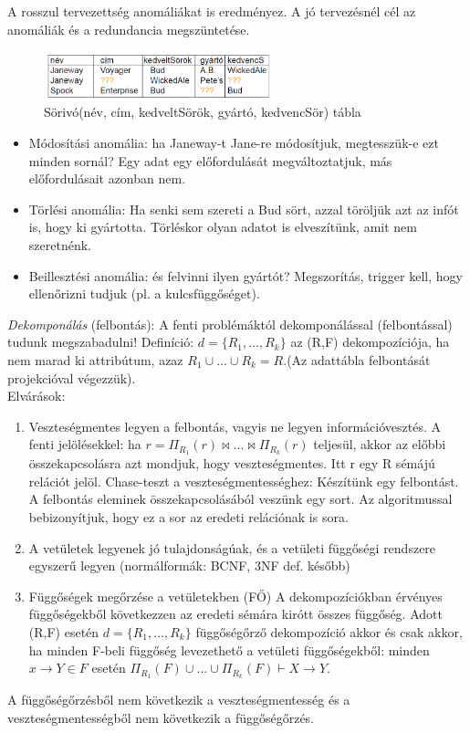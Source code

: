 \documentclass[margin=0px]{article}
\begin{document}
A rosszul tervezettség anomáliákat is eredményez. A jó tervezésnél cél az anomáliák és a redundancia megszüntetése.
\begin{figure}[H]
    \centering
    \includegraphics[width=0.6\textwidth]{img/dekomp1.png}
    \caption{Sörivó(név, cím, kedveltSörök, gyártó, kedvencSör) tábla}
\end{figure}
\begin{itemize}
    \item Módosítási anomália: ha Janeway-t Jane-re módosítjuk, megtesszük-e ezt minden sornál? Egy adat egy előfordulását megváltoztatjuk, más előfordulásait azonban nem.
    \item Törlési anomália: Ha senki sem szereti a Bud sört, azzal töröljük azt az infót is, hogy ki gyártotta. Törléskor olyan adatot is elveszítünk, amit nem szeretnénk.
    \item Beillesztési anomália: és felvinni ilyen gyártót? Megszorítás, trigger kell, hogy ellenőrizni tudjuk (pl. a kulcsfüggőséget).
\end{itemize}
\textit{Dekomponálás} (felbontás): A fenti problémáktól dekomponálással (felbontással) tudunk megszabadulni! Definíció: $d=\{R_1,...,R_k\}$ az (R,F) dekompozíciója, ha nem marad ki attribútum, azaz $R_1\cup ...\cup R_k=R$.(Az adattábla felbontását projekcióval végezzük). \\
Elvárások:
\begin{enumerate}
    \item Veszteségmentes legyen a felbontás, vagyis ne legyen információvesztés. A fenti jelölésekkel: ha $r = \Pi_{R_1}(r) \bowtie ... \bowtie \Pi_{R_k}(r)$ teljesül, akkor az előbbi összekapcsolásra azt mondjuk, hogy veszteségmentes. Itt r egy R sémájú relációt jelöl. Chase-teszt a veszteségmentességhez: Készítünk egy felbontást. A felbontás eleminek összekapcsolásából veszünk egy sort. Az algoritmussal bebizonyítjuk, hogy ez a sor az eredeti relációnak is sora.
    \item A vetületek legyenek jó tulajdonságúak, és a vetületi függőségi rendszere egyszerű legyen (normálformák: BCNF, 3NF def. később)
    \item Függőségek megőrzése a vetületekben (FŐ) A dekompozíciókban érvényes függőségekből következzen az eredeti sémára kirótt összes függőség. Adott (R,F) esetén $d=\{R_1,...,R_k\}$ függőségőrző dekompozíció akkor és csak akkor, ha minden F-beli függőség levezethető a vetületi függőségekből: minden $x \to Y \in F$ esetén $\Pi_{R_1}(F) \cup ... \cup \Pi_{R_k}(F) \vdash X \to Y$.
\end{enumerate}
A függőségőrzésből nem következik a veszteségmentesség és a veszteségmentességből nem következik a
függőségőrzés. \\
\end{document}
